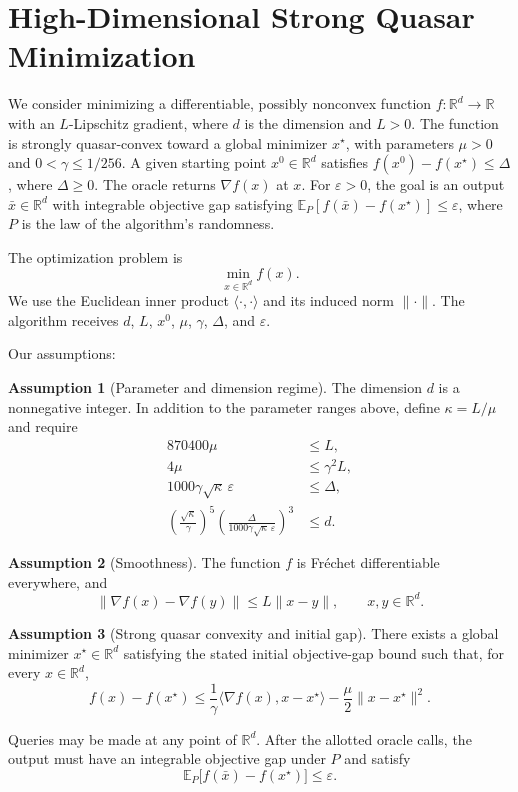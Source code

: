 \documentclass[10pt]{article}
\theoremstyle{definition}
\newtheorem{assumption}{Assumption}
\begin{document}
\section*{High-Dimensional Strong Quasar Minimization}
We consider minimizing a differentiable, possibly nonconvex function $f:\mathbb{R}^d\to\mathbb{R}$ with an $L$-Lipschitz gradient, where $d$ is the dimension and $L>0$. The function is strongly quasar-convex toward a global minimizer $x^\star$, with parameters $\mu>0$ and $0<\gamma\leq 1/256$. A given starting point $x^0\in\mathbb{R}^d$ satisfies $f(x^0)-f(x^\star)\leq\Delta$, where $\Delta\geq0$. The oracle returns $\nabla f(x)$ at $x$. For $\varepsilon>0$, the goal is an output $\bar{x}\in\mathbb{R}^d$ with integrable objective gap satisfying $\mathbb{E}_{P}[f(\bar{x})-f(x^\star)]\leq\varepsilon$, where $P$ is the law of the algorithm's randomness.

The optimization problem is
\[
\min_{x\in\mathbb{R}^d} f(x).
\]
We use the Euclidean inner product $\langle\cdot,\cdot\rangle$ and its induced norm $\|\cdot\|$. The algorithm receives $d$, $L$, $x^0$, $\mu$, $\gamma$, $\Delta$, and $\varepsilon$.

Our assumptions:
\begin{assumption}[Parameter and dimension regime]
The dimension $d$ is a nonnegative integer. In addition to the parameter ranges above, define $\kappa=L/\mu$ and require
\[
\begin{aligned}
870400\mu&\leq L,\\
4\mu&\leq\gamma^2 L,\\
1000\gamma\sqrt{\kappa}\,\varepsilon&\leq\Delta,\\
\left(\frac{\sqrt{\kappa}}{\gamma}\right)^5
\left(\frac{\Delta}{1000\gamma\sqrt{\kappa}\,\varepsilon}\right)^3
&\leq d.
\end{aligned}
\]
\end{assumption}

\begin{assumption}[Smoothness]
The function $f$ is Fr\'echet differentiable everywhere, and
\[
\|\nabla f(x)-\nabla f(y)\|\leq L\|x-y\|,
\qquad x,y\in\mathbb{R}^d.
\]
\end{assumption}

\begin{assumption}[Strong quasar convexity and initial gap]
There exists a global minimizer $x^\star\in\mathbb{R}^d$ satisfying the stated initial objective-gap bound such that, for every $x\in\mathbb{R}^d$,
\[
 f(x)-f(x^\star)
 \leq \frac{1}{\gamma}\langle\nabla f(x),x-x^\star\rangle
 -\frac{\mu}{2}\|x-x^\star\|^2.
\]
\end{assumption}

Queries may be made at any point of $\mathbb{R}^d$. After the allotted oracle calls, the output must have an integrable objective gap under $P$ and satisfy
\[
\mathbb{E}_{P}\bigl[f(\bar{x})-f(x^\star)\bigr]\leq\varepsilon.
\]
\end{document}
